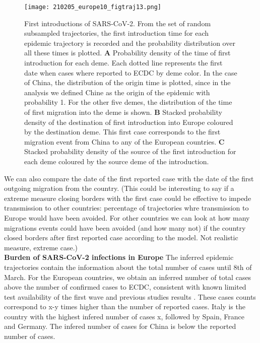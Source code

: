 \begin{figure}[p]
    \centering
    \texttt{[image: 210205\_europe10\_figtraj13.png]}
    \caption{First introductions of SARS-CoV-2. From the set of random subsampled trajectories, the first introduction time for each epidemic trajectory is recorded and the probability distribution over all these times is plotted. \textbf{A} Probability density of the time of first introduction for each deme. Each dotted line represents the first date when cases where reported to ECDC by deme color. In the case of China, the distribution of the origin time is plotted, since in the analysis we defined Chine as the origin of the epidemic with probability 1. For the other five demes, the distribution of the time of first migration into the deme is shown. \textbf{B} Stacked probability density of the destination of first introduction into Europe coloured by the destination deme. This first case corresponds to the first migration event from China to any of the European countries. \textbf{C} Stacked probability density of the source of the first introduction for each deme coloured by the source deme of the introduction.}
    \label{fig:first}
\end{figure}


We can also compare the date of the first reported case with the date of the first outgoing migration from the country. (This could be interesting to say if a extreme measure closing borders with the first case could be effective to impede transmission to other countries: percentage of trajectories whre transmission to Europe would have been avoided. For other countries we can look at how many migrations events could have been avoided (and how many not) if the country closed borders after first reported case according to the model. Not realistic measure, extreme case.)\\ 


\textbf{Burden of SARS-CoV-2 infections in Europe}
The inferred epidemic trajectories contain the information about the total number of cases until 8th of March. For the European countries, we obtain an inferred number of total cases above the number of confirmed cases to ECDC, consistent with known limited test availability of the first wave and  previous studies results \cite{Li2020} \cite{Wu2020}. These cases counts correspond to  x-y times higher than the number of reported cases. Italy is the country with the highest infered number of cases x, followed by Spain, France and Germany. The infered number of cases for China is below the reported number of cases. \\


